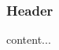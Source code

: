 \documentclass{beamer}
\begin{document}
\begin{frame}
    \frametitle{Header}
\end{frame} 


\begin{frame}
content...
\end{frame}
\end{document}
